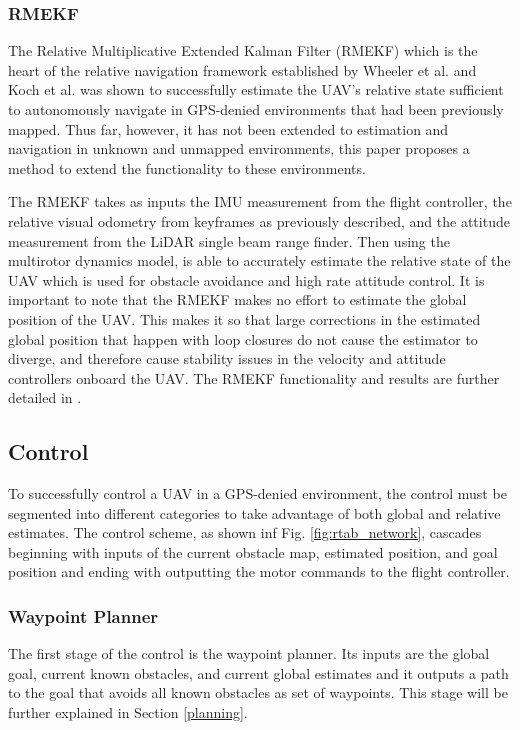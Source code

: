 \documentclass[letterpaper, 10 pt, conference]{ieeeconf}  %
\begin{document}
\subsubsection{RMEKF}

The Relative Multiplicative Extended Kalman Filter (RMEKF) which is the heart of the relative navigation framework established by Wheeler et al. \cite{Wheeler2017}\cite{Wheeler2018} and Koch et al. \cite{Koch2017} was shown to successfully estimate the UAV's relative state sufficient to autonomously navigate in GPS-denied environments that had been previously mapped. Thus far, however, it has not been extended to estimation and navigation in unknown and unmapped environments, this paper proposes a method to extend the functionality to these environments.

The RMEKF takes as inputs the IMU measurement from the flight controller, the relative visual odometry from keyframes as previously described, and the attitude measurement from the LiDAR single beam range finder. Then using the multirotor dynamics model, is able to accurately estimate the relative state of the UAV which is used for obstacle avoidance and high rate attitude control. It is important to note that the RMEKF makes no effort to estimate the global position of the UAV. This makes it so that large corrections in the estimated global position that happen with loop closures do not cause the estimator to diverge, and therefore cause stability issues in the velocity and attitude controllers onboard the UAV. The RMEKF functionality and results are further detailed in \cite{Koch2017}.

\subsection{Control}

To successfully control a UAV in a GPS-denied environment, the control must be segmented into different categories to take advantage of both global and relative estimates. The control scheme, as shown inf Fig. \ref{fig:rtab_network}, cascades beginning with inputs of the current obstacle map, estimated position, and goal position and ending with outputting the motor commands to the flight controller.

\subsubsection{Waypoint Planner}

The first stage of the control is the waypoint planner. Its inputs are the global goal, current known obstacles, and current global estimates and it outputs a path to the goal that avoids all known obstacles as set of waypoints. This stage will be further explained in Section \ref{planning}.
\end{document}
